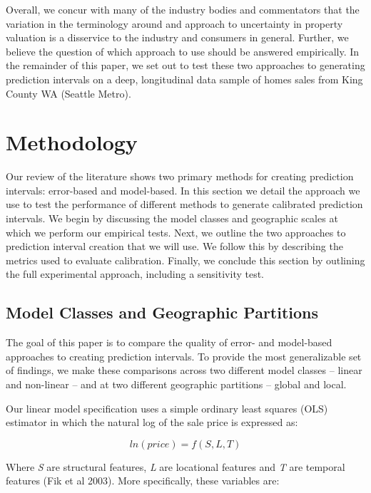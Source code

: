 \documentclass[colTwo]{anon}
\theoremstyle{definition}
\begin{document}
Overall, we concur with many of the industry bodies and commentators that the variation in the terminology around and approach to uncertainty in property valuation is a disservice to the industry and consumers in general.  Further, we believe the question of which approach to use should be answered empirically.  In the remainder of this paper, we set out to test these two approaches to generating prediction intervals on a deep, longitudinal data sample of homes sales from King County WA (Seattle Metro).

\section{Methodology}

Our review of the literature shows two primary methods for creating prediction intervals: error-based and model-based. In this section we detail the approach we use to test the performance of different methods to generate calibrated prediction intervals. We begin by discussing the model classes and geographic scales at which we perform our empirical tests.  Next, we outline the two approaches to prediction interval creation that we will use.  We follow this by describing the metrics used to evaluate calibration.  Finally, we conclude this section by outlining the full experimental approach, including a sensitivity test. 

\subsection{Model Classes and Geographic Partitions}

The goal of this paper is to compare the quality of error- and model-based approaches to creating prediction intervals.  To provide the most generalizable set of findings, we make these comparisons across two different model classes -- linear and non-linear -- and at two different geographic partitions -- global and local.  

Our linear model specification uses a simple ordinary least squares (OLS) estimator in which the natural log of the sale price is expressed as:

\[ln(price) = f(S, L, T)\]

Where \textit{S} are structural features, \textit{L} are locational features and \textit{T} are temporal features (Fik et al 2003).  More specifically, these variables are:
\end{document}
